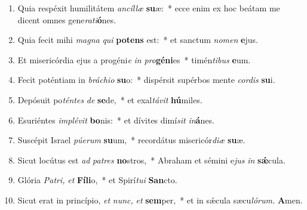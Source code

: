 \documentclass[12pt]{book}
\begin{document}
{
 

   \smallskip%
    \noindent%
 \begin{enumerate}[label=\arabic*.,%
			leftmargin=0pt, %
			itemindent=0mm, %
			labelsep=3pt, %
			labelwidth=0pt, %
			rightmargin=0pt, %
			parsep=0pt, %
			topsep=0pt, %
			itemsep=0pt,%
			start=3]
    
    \end{enumerate}

\myrule

 
 

    \smallskip%
    \noindent%
 \begin{enumerate}[label=\arabic*.,%
			leftmargin=0pt, %
			itemindent=0mm, %
			labelsep=3pt, %
			labelwidth=0pt, %
			rightmargin=0pt, %
			parsep=0pt, %
			topsep=0pt, %
			itemsep=0pt,%
			start=3]
\item Quia respéxit humilitátem \textit{ancíllæ} \textbf{su}æ:~* ecce enim ex hoc beátam me dicent omnes gene\textit{rati}\textbf{ó}nes.
\item Quia fecit mihi \textit{magna} \textit{qui} \textbf{pot}\textbf{ens} est:~* et sanctum \textit{nomen} \textbf{e}jus.
\item Et misericórdia ejus a progéni\textit{e} \textit{in} \textit{pro}\textbf{gé}\textbf{ni}es~* timén\textit{tibus} \textbf{e}um.
\item Fecit poténtiam in \textit{bráchio} \textbf{su}o:~* dispérsit supérbos mente \textit{cordis} \textbf{su}i.
\item Depósuit po\textit{téntes} \textit{de} \textbf{se}de,~* et exal\textit{távit} \textbf{hú}miles.
\item Esuriéntes \textit{implévit} \textbf{bo}nis:~* et dívites dimí\hspace{0.04em}\textit{sit} \textit{in}\textbf{á}nes.
\item Suscépit Israel \textit{púerum} \textbf{su}um,~* recordátus misericór\textit{diæ} \textbf{su}æ.
\item Sicut locútus est \textit{ad} \textit{pa}\textit{tres} \textbf{no}stros,~* Abraham et sémini e\hspace{0.02em}\textit{jus} \textit{in} \textbf{sǽ}cula.
\item Glória \textit{Pa}\textit{tri,} \textit{et} \textbf{Fí}\textbf{li}o,~* et Spirí\tinyhspace\textit{tui} \textbf{San}cto.
\item Sicut erat in princípio, \textit{et} \textit{nunc,} \textit{et} \textbf{sem}per,~* et in sǽcula sæcu\tinyhspace\textit{lórum.} \textbf{A}men.
    \end{enumerate}

}
\end{document}

